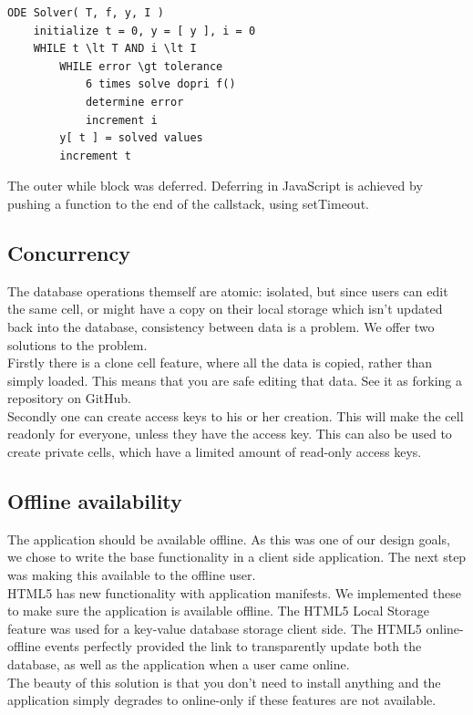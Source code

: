 \documentclass[10pt,a4paper]{report}
\begin{document}
			\begin{lstlisting}
ODE Solver( T, f, y, I )
	initialize t = 0, y = [ y ], i = 0
	WHILE t \lt T AND i \lt I
		WHILE error \gt tolerance
			6 times solve dopri f()
			determine error
			increment i
		y[ t ] = solved values
		increment t
			\end{lstlisting}

			The outer while block was deferred. Deferring in JavaScript is achieved by pushing a function to the end of the callstack, using setTimeout.
		
		\subsection{Concurrency}
			The database operations themself are atomic: isolated, but since users can edit the same cell, or might have a copy on their local storage which isn't updated back into the database, consistency between data is a problem. We offer two solutions to the problem.\\ 
			
			Firstly there is a clone cell feature, where all the data is copied, rather than simply loaded. This means that you are safe editing that data. See it as forking a repository on GitHub.\\
			
			Secondly one can create access keys to his or her creation. This will make the cell readonly for everyone, unless they have the access key. This can also be used to create private cells, which have a limited amount of read-only access keys.
		
		\subsection{Offline availability}
			The application should be available offline. As this was one of our design goals, we chose to write the base functionality in a client side application. The next step was making this available to the offline user.\\
			HTML5 has new functionality with application manifests. We implemented these to make sure the application is available offline. The HTML5 Local Storage feature was used for a key-value database storage client side. The HTML5 online-offline events perfectly provided the link to transparently update both the database, as well as the application when a user came online.\\
			The beauty of this solution is that you don't need to install anything and the application simply degrades to online-only if these features are not available.
		
\end{document}
